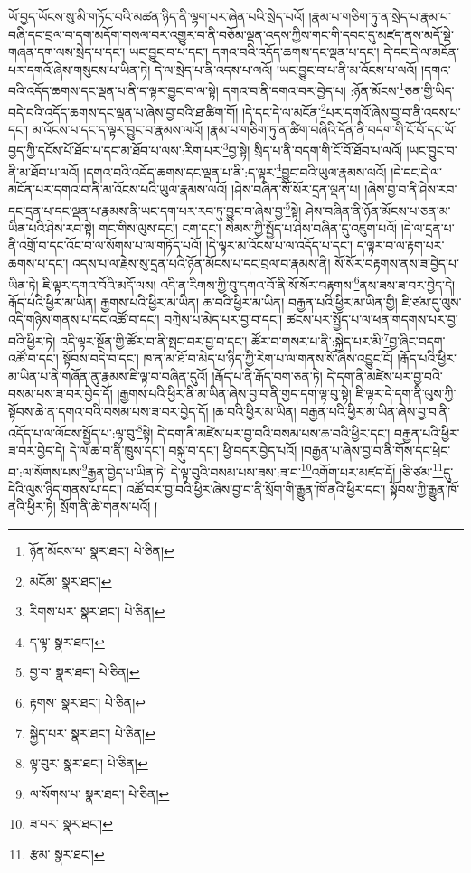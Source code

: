 ཡོ་བྱད་ཡོངས་སུ་མི་གཏོང་བའི་མཚན་ཉིད་ནི་ལྷག་པར་ཞེན་པའི་སྲེད་པའོ། །རྣམ་པ་གཅིག་ཏུ་ན་སྲེད་པ་རྣམ་པ་བཞི་དང་བྲལ་བ་དག་མདོག་གསལ་བར་འགྱུར་བ་ནི་བཅོམ་ལྡན་འདས་ཀྱིས་གང་གི་དབང་དུ་མཛད་ནས་མདོ་སྡེ་གཞན་དག་ལས་སྲེད་པ་དང་། ཡང་བྱུང་བ་པ་དང་། དགའ་བའི་འདོད་ཆགས་དང་ལྡན་པ་དང་། དེ་དང་དེ་ལ་མངོན་པར་དགའོ་ཞེས་གསུངས་པ་ཡིན་ཏེ། དེ་ལ་སྲེད་པ་ནི་འདས་པ་ལའོ། །ཡང་བྱུང་བ་པ་ནི་མ་འོངས་པ་ལའོ། །དགའ་བའི་འདོད་ཆགས་དང་ལྡན་པ་ནི་ད་ལྟར་བྱུང་བ་ལ་སྟེ། དགའ་བ་ནི་དགའ་བར་བྱེད་པ། :ཉོན་མོངས་\footnote{ཉོན་མོངས་པ་  སྣར་ཐང་།  པེ་ཅིན། }ཅན་གྱི་ཡིད་བདེ་བའི་འདོད་ཆགས་དང་ལྡན་པ་ཞེས་བྱ་བའི་ཐ་ཚིག་གོ། །དེ་དང་དེ་ལ་མངོན་\footnote{མངོམ་  སྣར་ཐང་། }པར་དགའོ་ཞེས་བྱ་བ་ནི་འདས་པ་དང་། མ་འོངས་པ་དང་ད་ལྟར་བྱུང་བ་རྣམས་ལའོ། །རྣམ་པ་གཅིག་ཏུ་ན་ཚིག་བཞིའི་དོན་ནི་བདག་གི་ངོ་བོ་དང་ཡོ་བྱད་ཀྱི་དངོས་པོ་ཐོབ་པ་དང་མ་ཐོབ་པ་ལས་:རིག་པར་\footnote{རིགས་པར་  སྣར་ཐང་།  པེ་ཅིན། }བྱ་སྟེ། སྲིད་པ་ནི་བདག་གི་ངོ་བོ་ཐོབ་པ་ལའོ། །ཡང་བྱུང་བ་ནི་མ་ཐོབ་པ་ལའོ། །དགའ་བའི་འདོད་ཆགས་དང་ལྡན་པ་ནི་:ད་ལྟར་\footnote{ད་ལྟ་  སྣར་ཐང་། }བྱུང་བའི་ཡུལ་རྣམས་ལའོ། །དེ་དང་དེ་ལ་མངོན་པར་དགའ་བ་ནི་མ་འོངས་པའི་ཡུལ་རྣམས་ལའོ། །ཤེས་བཞིན་སོ་སོར་དྲན་ལྡན་པ། །ཞེས་བྱ་བ་ནི་ཤེས་རབ་དང་དྲན་པ་དང་ལྡན་པ་རྣམས་ནི་ཡང་དག་པར་རབ་ཏུ་བྱུང་བ་ཞེས་བྱ་\footnote{བྱ་བ་  སྣར་ཐང་།  པེ་ཅིན། }སྟེ། ཤེས་བཞིན་ནི་ཉོན་མོངས་པ་ཅན་མ་ཡིན་པའི་ཤེས་རབ་སྟེ། གང་གིས་ལུས་དང་། ངག་དང་། སེམས་ཀྱི་སྤྱོད་པ་ཤེས་བཞིན་དུ་འཇུག་པའོ། །དེ་ལ་དྲན་པ་ནི་འགྲོ་བ་དང་འོང་བ་ལ་སོགས་པ་ལ་གཏོད་པའོ། །དེ་ལྟར་མ་འོངས་པ་ལ་འདོད་པ་དང་། ད་ལྟར་བ་ལ་རྟག་པར་ཆགས་པ་དང་། འདས་པ་ལ་རྗེས་སུ་དྲན་པའི་ཉོན་མོངས་པ་དང་བྲལ་བ་རྣམས་ནི། སོ་སོར་བརྟགས་ནས་ཟ་བྱེད་པ་ཡིན་ཏེ། ཇི་ལྟར་དགའ་བོའི་མདོ་ལས། འདི་ན་རིགས་ཀྱི་བུ་དགའ་བོ་ནི་སོ་སོར་བརྟགས་\footnote{རྟགས་  སྣར་ཐང་།  པེ་ཅིན། }ནས་ཟས་ཟ་བར་བྱེད་དེ། རྒོད་པའི་ཕྱིར་མ་ཡིན། རྒྱགས་པའི་ཕྱིར་མ་ཡིན། ཆ་བའི་ཕྱིར་མ་ཡིན། བརྒྱན་པའི་ཕྱིར་མ་ཡིན་གྱི། ཇི་ཙམ་དུ་ལུས་འདི་གཉིས་གནས་པ་དང་འཚོ་བ་དང་། བཀྲེས་པ་མེད་པར་བྱ་བ་དང་། ཚངས་པར་སྤྱོད་པ་ལ་ཕན་གདགས་པར་བྱ་བའི་ཕྱིར་ཏེ། འདི་ལྟར་སྔོན་གྱི་ཚོར་བ་ནི་སྤང་བར་བྱ་བ་དང་། ཚོར་བ་གསར་པ་ནི་:སྐྱེད་པར་མི་\footnote{སྐྱེད་པར་  སྣར་ཐང་།  པེ་ཅིན། }བྱ་ཞིང་བདག་འཚོ་བ་དང་། སྟོབས་བདེ་བ་དང་། ཁ་ན་མ་ཐོ་བ་མེད་པ་ཉིད་ཀྱི་རེག་པ་ལ་གནས་སོ་ཞེས་འབྱུང་ངོ། །རྒོད་པའི་ཕྱིར་མ་ཡིན་པ་ནི་གཞོན་ནུ་རྣམས་ཇི་ལྟ་བ་བཞིན་དུའོ། །རྒོད་པ་ནི་རྒོད་བག་ཅན་ཏེ། དེ་དག་ནི་མཛེས་པར་བྱ་བའི་བསམ་པས་ཟ་བར་བྱེད་དོ། །རྒྱགས་པའི་ཕྱིར་ནི་མ་ཡིན་ཞེས་བྱ་བ་ནི་གྱད་དག་ལྟ་བུ་སྟེ། ཇི་ལྟར་དེ་དག་ནི་ལུས་ཀྱི་སྟོབས་ཆེ་ན་དགའ་བའི་བསམ་པས་ཟ་བར་བྱེད་དོ། །ཆ་བའི་ཕྱིར་མ་ཡིན། བརྒྱན་པའི་ཕྱིར་མ་ཡིན་ཞེས་བྱ་བ་ནི་འདོད་པ་ལ་ལོངས་སྤྱོད་པ་:ལྟ་བུ་\footnote{ལྟ་བུར་  སྣར་ཐང་།  པེ་ཅིན། }སྟེ། དེ་དག་ནི་མཛེས་པར་བྱ་བའི་བསམ་པས་ཆ་བའི་ཕྱིར་དང་། བརྒྱན་པའི་ཕྱིར་ཟ་བར་བྱེད་དེ། དེ་ལ་ཆ་བ་ནི་ཁྲུས་དང་། བསྐུ་བ་དང་། ཕྱི་བདར་བྱེད་པའོ། །བརྒྱན་པ་ཞེས་བྱ་བ་ནི་གོས་དང་ཕྲེང་བ་:ལ་སོགས་པས་\footnote{ལ་སོགས་པ་  སྣར་ཐང་།  པེ་ཅིན། }རྒྱན་བྱེད་པ་ཡིན་ཏེ། དེ་ལྟ་བུའི་བསམ་པས་ཟས་:ཟ་བ་\footnote{ཟ་བར་  སྣར་ཐང་། }འགོག་པར་མཛད་དོ། །ཅི་ཙམ་\footnote{རྩམ་  སྣར་ཐང་། }དུ་དེའི་ལུས་ཉིད་གནས་པ་དང་། འཚོ་བར་བྱ་བའི་ཕྱིར་ཞེས་བྱ་བ་ནི་སྲོག་གི་རྒྱུན་ཁོ་ནའི་ཕྱིར་དང་། སྟོབས་ཀྱི་རྒྱུན་ཁོ་ནའི་ཕྱིར་ཏེ། སྲོག་ནི་ཚེ་གནས་པའོ། །
